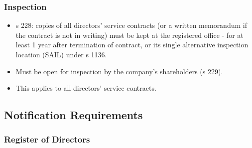 \documentclass[
]{article}
\providecommand{\tightlist}{%
  \setlength{\itemsep}{0pt}\setlength{\parskip}{0pt}}
\begin{document}
\hypertarget{inspection-1}{%
\subsubsection{Inspection}\label{inspection-1}}

\begin{itemize}
\tightlist
\item
  s 228: copies of all directors' service contracts (or a written
  memorandum if the contract is not in writing) must be kept at the
  registered office - for at least 1 year after termination of contract,
  or its single alternative inspection location (SAIL) under s 1136.
\item
  Must be open for inspection by the company's shareholders (s 229).
\item
  This applies to all directors' service contracts.
\end{itemize}

\hypertarget{notification-requirements}{%
\subsection{Notification Requirements}\label{notification-requirements}}

\hypertarget{register-of-directors}{%
\subsubsection{Register of Directors}\label{register-of-directors}}
\end{document}
